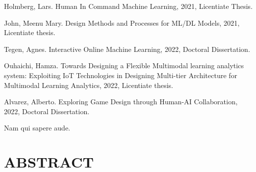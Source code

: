 \documentclass[hidelinks,green,onecolumn,twoside]{dissertation}
\newcommand{\myMainTitle}{Exploring Game Design through Human-AI Collaboration}
\newcommand{\graduationYear}{2022}
\begin{document}
\begin{otherTheses}
    \item Holmberg, Lars. Human In Command Machine Learning, 2021, Licentiate Thesis.
    \item John, Meenu Mary. Design Methods and Processes for ML/DL Models, 2021, Licentiate thesis.
    \item Tegen, Agnes. Interactive Online Machine Learning, 2022, Doctoral Dissertation.
    \item Ouhaichi, Hamza. Towards Designing a Flexible Multimodal learning analytics system: Exploiting IoT Technologies in Designing Multi-tier Architecture for Multimodal Learning Analytics, 2022, Licentiate thesis.
    \item Alvarez, Alberto. \myMainTitle, \graduationYear, Doctoral Dissertation.
\end{otherTheses}

\begin{dedication}
Nam qui sapere aude.


\end{dedication}{}


\setlength{\parindent}{0.9em}
\cleardoublepage
{}
{}
\section*{ABSTRACT}
\normalfont

\end{document}
